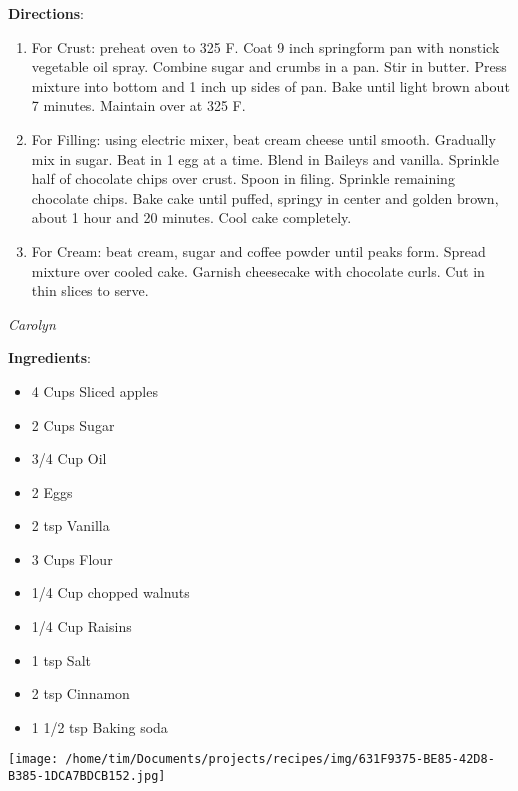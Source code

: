 \documentclass[11pt, twoside, openany]{book}
\begin{document}
\textbf{Directions}:
\vspace{-3mm}\begin{enumerate}\setlength\itemsep{-1mm}
\item For Crust: preheat oven to 325 F. Coat 9 inch springform pan with nonstick vegetable oil spray. Combine sugar and crumbs in a pan. Stir in butter. Press mixture into bottom and 1 inch up sides of pan. Bake until light brown about 7 minutes. Maintain over at 325 F.
\item For Filling: using electric mixer, beat cream cheese until smooth. Gradually mix in sugar. Beat in 1 egg at a time. Blend in Baileys and vanilla. 
Sprinkle half of chocolate chips over crust. Spoon in filing. Sprinkle remaining chocolate chips. Bake cake until puffed, springy in center and golden brown, about 1 hour and 20 minutes. Cool cake completely. 
\item For Cream: beat cream, sugar and coffee powder until peaks form. Spread mixture over cooled cake. 
  Garnish cheesecake with chocolate curls. Cut in thin slices to serve.
\end{enumerate}
 \label{apple-cake}\hfill\textit{Carolyn}\\
\begin{minipage}[t]{0.8\linewidth}
\textbf{Ingredients}:\vspace{-3mm}
\begin{multicols}{2}
\begin{itemize}\setlength\itemsep{-1mm}
\item 4 Cups Sliced apples
\item 2 Cups Sugar
\item 3/4 Cup Oil
\item 2 Eggs
\item 2 tsp Vanilla
\item 3 Cups Flour
\item 1/4 Cup chopped walnuts
\item 1/4 Cup Raisins
\item 1 tsp Salt
\item 2 tsp Cinnamon
\item 1 1/2 tsp Baking soda
\end{itemize}
\end{multicols}
\end{minipage}
\begin{minipage}[t]{0.2\linewidth}
\centering \strut\vspace*{-\baselineskip}\newline
\texttt{[image: /home/tim/Documents/projects/recipes/img/631F9375-BE85-42D8-B385-1DCA7BDCB152.jpg]}\\
\end{minipage}\vspace{3mm}
\end{document}
